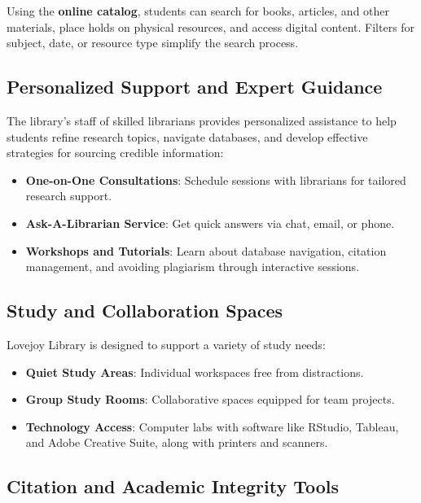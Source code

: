 \documentclass[
]{book}
\providecommand{\tightlist}{%
  \setlength{\itemsep}{0pt}\setlength{\parskip}{0pt}}
\begin{document}
Using the \textbf{online catalog}, students can search for books, articles, and other materials, place holds on physical resources, and access digital content. Filters for subject, date, or resource type simplify the search process.

\subsection*{Personalized Support and Expert Guidance}\label{personalized-support-and-expert-guidance}

The library's staff of skilled librarians provides personalized assistance to help students refine research topics, navigate databases, and develop effective strategies for sourcing credible information:

\begin{itemize}
\tightlist
\item
  \textbf{One-on-One Consultations}: Schedule sessions with librarians for tailored research support.
\item
  \textbf{Ask-A-Librarian Service}: Get quick answers via chat, email, or phone.
\item
  \textbf{Workshops and Tutorials}: Learn about database navigation, citation management, and avoiding plagiarism through interactive sessions.
\end{itemize}

\subsection*{Study and Collaboration Spaces}\label{study-and-collaboration-spaces}

Lovejoy Library is designed to support a variety of study needs:

\begin{itemize}
\tightlist
\item
  \textbf{Quiet Study Areas}: Individual workspaces free from distractions.
\item
  \textbf{Group Study Rooms}: Collaborative spaces equipped for team projects.
\item
  \textbf{Technology Access}: Computer labs with software like RStudio, Tableau, and Adobe Creative Suite, along with printers and scanners.
\end{itemize}

\subsection*{Citation and Academic Integrity Tools}\label{citation-and-academic-integrity-tools}
\end{document}

